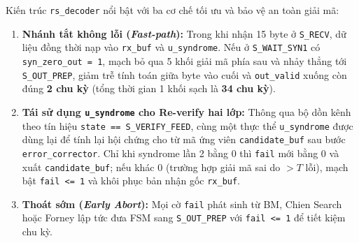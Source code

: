 Kiến trúc \texttt{rs\_decoder} nổi bật với ba cơ chế tối ưu và bảo vệ an toàn giải mã:
\begin{enumerate}
    \item \textbf{Nhánh tắt không lỗi (\textit{Fast-path}):} Trong khi nhận 15 byte ở \texttt{S\_RECV}, dữ liệu đồng thời nạp vào \texttt{rx\_buf} và \texttt{u\_syndrome}. Nếu ở \texttt{S\_WAIT\_SYN1} có \texttt{syn\_zero\_out = 1}, mạch bỏ qua 5 khối giải mã phía sau và nhảy thẳng tới \texttt{S\_OUT\_PREP}, giảm trễ tính toán giữa byte vào cuối và \texttt{out\_valid} xuống còn đúng \textbf{2 chu kỳ} (tổng thời gian 1 khối sạch là \textbf{34 chu kỳ}).
    \item \textbf{Tái sử dụng \texttt{u\_syndrome} cho Re-verify hai lớp:} Thông qua bộ dồn kênh theo tín hiệu \texttt{state == S\_VERIFY\_FEED}, cùng một thực thể \texttt{u\_syndrome} được dùng lại để tính lại hội chứng cho từ mã ứng viên \texttt{candidate\_buf} sau bước \texttt{error\_corrector}. Chỉ khi syndrome lần 2 bằng 0 thì \texttt{fail} mới bằng 0 và xuất \texttt{candidate\_buf}; nếu khác 0 (trường hợp giải mã sai do $>T$ lỗi), mạch bật \texttt{fail <= 1} và khôi phục bản nhận gốc \texttt{rx\_buf}.
    \item \textbf{Thoát sớm (\textit{Early Abort}):} Mọi cờ \texttt{fail} phát sinh từ BM, Chien Search hoặc Forney lập tức đưa FSM sang \texttt{S\_OUT\_PREP} với \texttt{fail <= 1} để tiết kiệm chu kỳ.
\end{enumerate}

